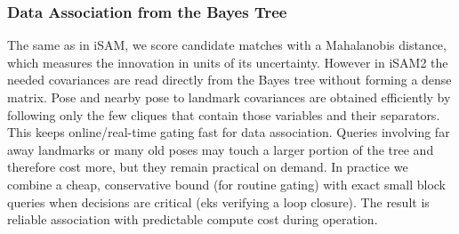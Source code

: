 \subsubsection{Data Association from the Bayes Tree}
The same as in \gls{iSAM}, we score candidate matches with a Mahalanobis distance, which measures the innovation in units of its uncertainty. However in \gls{iSAM}2 the needed covariances are read directly from the Bayes tree without forming a dense matrix. Pose and nearby pose to landmark covariances are obtained efficiently by following only the few cliques that contain those variables and their separators. This keeps online/real-time gating fast for data association. Queries involving far away landmarks or many old poses may touch a larger portion of the tree and therefore cost more, but they remain practical on demand. In practice we combine a cheap, conservative bound (for routine gating) with exact small block queries when decisions are critical (eks verifying a loop closure). The result is reliable association with predictable compute cost during operation.



